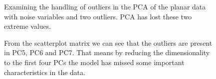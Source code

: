 \documentclass[
  letterpaper,
]{krantz}
\begin{document}
\begin{figure}

\begin{minipage}{0.50\linewidth}



\end{minipage}%
%
\begin{minipage}{0.50\linewidth}



\end{minipage}%

\caption{\label{fig-p-o-pca-pdf}Examining the handling of outliers in
the PCA of the planar data with noise variables and two outliers. PCA
has lost these two extreme values. }

\end{figure}%

\begin{figure}


\caption{\label{fig-plane-o-n-pairs}From the scatterplot matrix we can
see that the outliers are present in PC5, PC6 and PC7. That means by
reducing the dimensionality to the first four PCs the model has missed
some important characteristics in the data.}

\end{figure}%
\end{document}
